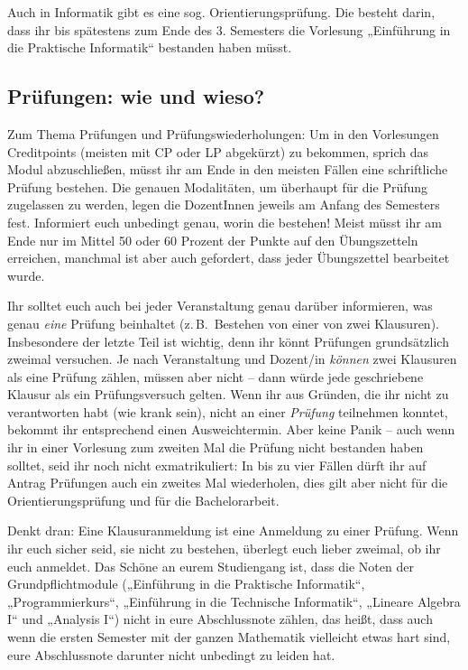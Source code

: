 Auch in Informatik gibt es eine sog. Orientierungsprüfung. Die besteht darin, dass ihr bis spätestens zum Ende des 3. Semesters die Vorlesung „Einführung in die Praktische Informatik“ bestanden haben müsst.


\subsection{Prüfungen: wie und wieso?}

Zum Thema Prüfungen und Prüfungswiederholungen: Um in den Vorlesungen Creditpoints (meisten mit \gls{CP} oder \gls{LP} abgekürzt) zu bekommen, sprich das Modul abzuschließen, müsst ihr am Ende in den meisten Fällen eine schriftliche Prüfung bestehen. Die genauen Modalitäten, um überhaupt für die Prüfung zugelassen zu werden, legen die DozentInnen jeweils am Anfang des Semesters fest. Informiert euch unbedingt genau, worin die bestehen! Meist müsst ihr am Ende nur im Mittel 50 oder 60 Prozent der Punkte auf den Übungszetteln erreichen, manchmal ist aber auch gefordert, dass jeder Übungszettel bearbeitet wurde.

Ihr solltet euch auch bei jeder Veranstaltung genau darüber informieren, was genau \emph{eine} Prüfung beinhaltet (z.\,B.\ Bestehen von einer von zwei Klausuren). Insbesondere der letzte Teil ist wichtig, denn ihr könnt Prüfungen grundsätzlich zweimal versuchen. Je nach Veranstaltung und Dozent/in \emph{können} zwei Klausuren als eine Prüfung zählen, müssen aber nicht -- dann würde jede geschriebene Klausur als ein Prüfungsversuch gelten. Wenn ihr aus Gründen, die ihr nicht zu verantworten habt (wie krank sein), nicht an einer \emph{Prüfung} teilnehmen konntet, bekommt ihr entsprechend einen Ausweichtermin. Aber keine Panik -- auch wenn ihr in einer Vorlesung zum zweiten Mal die Prüfung nicht bestanden haben solltet, seid ihr noch nicht exmatrikuliert: In bis zu vier Fällen dürft ihr auf Antrag Prüfungen auch ein zweites Mal wiederholen, dies gilt aber nicht für die Orientierungsprüfung und für die Bachelorarbeit.

Denkt dran: Eine Klausuranmeldung ist eine Anmeldung zu einer Prüfung. Wenn ihr euch sicher seid, sie nicht zu bestehen, überlegt euch lieber zweimal, ob ihr euch anmeldet. Das Schöne an eurem Studiengang ist, dass die Noten der Grundpflichtmodule („Einführung in die Praktische Informatik“, „Programmierkurs“, „Einführung in die Technische Informatik“, „Lineare Algebra I“ und „Analysis I“) nicht in eure Abschlussnote zählen, das heißt, dass auch wenn die ersten Semester mit der ganzen Mathematik vielleicht etwas hart sind, eure Abschlussnote darunter nicht unbedingt zu leiden hat.


\vspace{-\parskip}
